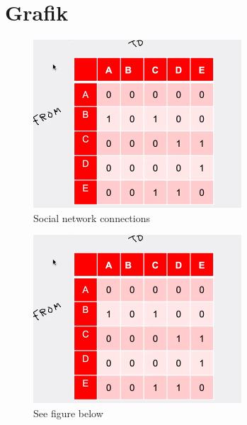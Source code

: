 \documentclass{article}
\begin{document}
\section{Grafik}
    \begin{figure}[h!]
        \begin{center}            
            \includegraphics[scale=1.0]{images/picture.png}            
            \caption{Social network connections}
            \label{fig:1}
        \end{center}
    \end{figure}
    \begin{figure}[h!]
        \begin{center}
            \caption{See figure below}
            \includegraphics[scale=.5]{images/picture.png}
        \end{center}
    \end{figure}
\end{document}
